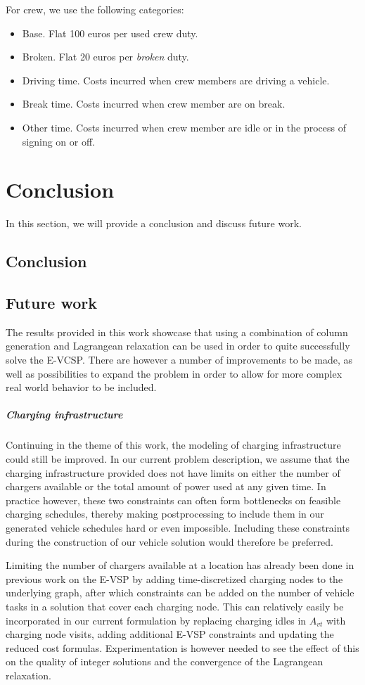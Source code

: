 \documentclass[]{article}
\begin{document}
\noindent For crew, we use the following categories: 
\begin{itemize}
  \item Base. Flat 100 euros per used crew duty.
  \item Broken. Flat 20 euros per \textit{broken} duty.
  \item Driving time. Costs incurred when crew members are driving a vehicle. 
  \item Break time. Costs incurred when crew member are on break. 
  \item Other time. Costs incurred when crew member are idle or in the process of signing on or off. 
\end{itemize}


\section{Conclusion}
In this section, we will provide a conclusion and discuss future work. 
\subsection{Conclusion}


\subsection{Future work}
The results provided in this work showcase that using a combination of column generation and Lagrangean relaxation can be used in order to quite successfully solve the E-VCSP. There are however a number of improvements to be made, as well as possibilities to expand the problem in order to allow for more complex real world behavior to be included. 

\subparagraph{Charging infrastructure}
Continuing in the theme of this work, the modeling of charging infrastructure could still be improved. In our current problem description, we assume that the charging infrastructure provided does not have limits on either the number of chargers available or the total amount of power used at any given time. In practice however, these two constraints can often form bottlenecks on feasible charging schedules, thereby making postprocessing to include them in our generated vehicle schedules hard or even impossible. Including these constraints during the construction of our vehicle solution would therefore be preferred. 

Limiting the number of chargers available at a location has already been done in previous work on the E-VSP by adding time-discretized charging nodes to the underlying graph, after which constraints can be added on the number of vehicle tasks in a solution that cover each charging node. This can relatively easily be incorporated in our current formulation by replacing charging idles in $A_{vt}$ with charging node visits, adding additional E-VSP constraints and updating the reduced cost formulas. Experimentation is however needed to see the effect of this on the quality of integer solutions and the convergence of the Lagrangean relaxation. 
\end{document}
